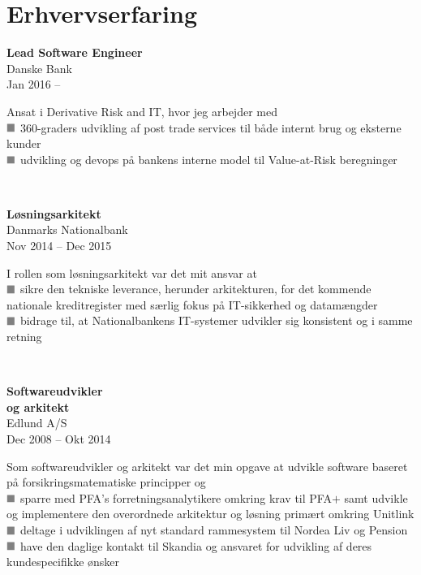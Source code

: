 \documentclass[10pt, a4paper]{article}
\newcommand*{\greysquare}{\textcolor{gray}{\blacksquare}}
\begin{document}
\section{Erhvervserfaring}
\begin{Row}%
  \begin{Cell}{1}
    \textbf{Lead Software Engineer} \\ [1ex]
    Danske Bank \\
    Jan 2016 -- %
  \end{Cell}
  \begin{Cell}{3}
    Ansat i Derivative Risk and IT, hvor jeg arbejder med \\ [1ex]
    $\greysquare$ 360-graders udvikling af post trade services til både internt
    brug og eksterne kunder \\
    $\greysquare$ udvikling og devops på bankens interne model til Value-at-Risk
     beregninger \\
  \end{Cell}
\end{Row}
\\[0.5cm]\begin{Row}%
  \begin{Cell}{1}
    \textbf{Løsningsarkitekt} \\ [1ex]
    Danmarks Nationalbank \\
    Nov 2014 -- Dec 2015 %
  \end{Cell}
  \begin{Cell}{3}
    I rollen som løsningsarkitekt var det mit ansvar at \\ [1ex]
    $\greysquare$ sikre den tekniske leverance, herunder arkitekturen, for det
    kommende nationale kreditregister med særlig fokus på IT-sikkerhed og
    datamængder \\
    $\greysquare$ bidrage til, at Nationalbankens IT-systemer udvikler sig
    konsistent og i samme retning
  \end{Cell}
\end{Row}
\\[0.5cm]
\begin{Row}
  \begin{Cell}{1}
    \textbf{Softwareudvikler \\
    og arkitekt} \\ [1ex]
    Edlund A/S \\
    Dec 2008 -- Okt 2014 %
  \end{Cell}
  \begin{Cell}{3}
    Som softwareudvikler og arkitekt var det min opgave at udvikle software
    baseret på forsikringsmatematiske principper og \\ [1ex]
    $\greysquare$ sparre med PFA's forretningsanalytikere omkring krav til
    PFA$+$ samt udvikle og implementere den overordnede arkitektur og løsning
    primært omkring Unitlink \\
    $\greysquare$ deltage i udviklingen af nyt standard rammesystem til Nordea
    Liv og Pension \\
    $\greysquare$ have den daglige kontakt til Skandia og ansvaret for udvikling
    af deres kundespecifikke ønsker
  \end{Cell}
\end{Row}
\end{document}
